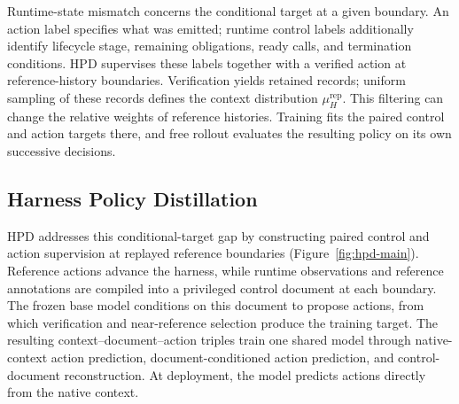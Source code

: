 \documentclass{article}
\begin{document}
Runtime-state mismatch concerns the conditional target at a given boundary.
An action label specifies what was emitted; runtime control labels additionally
identify lifecycle stage, remaining obligations, ready calls, and termination
conditions. HPD supervises these labels together with a verified action at
reference-history boundaries. Verification yields retained records; uniform sampling of these records
defines the context distribution $\mu_H^{\mathrm{rep}}$. This filtering
can change the relative weights of reference histories. Training fits the paired
control and action targets there, and free rollout evaluates the resulting
policy on its own successive decisions.

\subsection{Harness Policy Distillation}
\label{sec:hpd}

HPD addresses this conditional-target gap by constructing paired control
and action supervision at replayed reference boundaries
(Figure~\ref{fig:hpd-main}).
Reference actions advance the harness, while runtime observations and
reference annotations are compiled into a privileged control document at
each boundary. The frozen base model conditions on this document to propose
actions, from which verification and near-reference selection produce
the training target. The resulting context--document--action triples
train one shared model through native-context action prediction,
document-conditioned action prediction, and control-document reconstruction.
At deployment, the model predicts actions directly from the native context.
\end{document}
